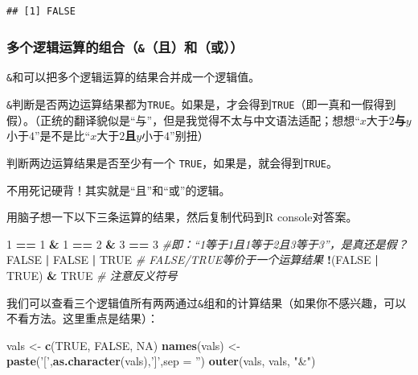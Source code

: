 \documentclass[]{book}
\newenvironment{Shaded}{\begin{snugshade}}{\end{snugshade}}
\newcommand{\CommentTok}[1]{\textcolor[rgb]{0.56,0.35,0.01}{\textit{#1}}}
\newcommand{\DataTypeTok}[1]{\textcolor[rgb]{0.13,0.29,0.53}{#1}}
\newcommand{\DecValTok}[1]{\textcolor[rgb]{0.00,0.00,0.81}{#1}}
\newcommand{\KeywordTok}[1]{\textcolor[rgb]{0.13,0.29,0.53}{\textbf{#1}}}
\newcommand{\NormalTok}[1]{#1}
\newcommand{\OperatorTok}[1]{\textcolor[rgb]{0.81,0.36,0.00}{\textbf{#1}}}
\newcommand{\OtherTok}[1]{\textcolor[rgb]{0.56,0.35,0.01}{#1}}
\newcommand{\StringTok}[1]{\textcolor[rgb]{0.31,0.60,0.02}{#1}}
\begin{document}
\begin{verbatim}
## [1] FALSE
\end{verbatim}

\subsubsection{\texorpdfstring{多个逻辑运算的组合（\texttt{\&}（且）和\texttt{\textbar{}}（或））}{多个逻辑运算的组合（\&（且）和\textbar{}（或））}}

\texttt{\&}和\texttt{\textbar{}}可以把多个逻辑运算的结果合并成一个逻辑值。

\texttt{\&}判断是否两边运算结果都为\texttt{TRUE}。如果是，才会得到\texttt{TRUE}（即一真和一假得到假）。（正统的翻译貌似是``与''，但是我觉得不太与中文语法适配；想想``\(x\)大于\(2\)\textbf{与}\(y\)小于\(4\)''是不是比``\(x\)大于\(2\)\textbf{且}\(y\)小于\(4\)''别扭）

\texttt{\textbar{}}判断两边运算结果是否至少有一个 \texttt{TRUE}，如果是，就会得到\texttt{TRUE}。

不用死记硬背！其实就是``且''和``或''的逻辑。

用脑子想一下以下三条运算的结果，然后复制代码到R console对答案。

\begin{Shaded}
\begin{Highlighting}[]
\DecValTok{1} \OperatorTok{==}\StringTok{ }\DecValTok{1} \OperatorTok{&}\StringTok{ }\DecValTok{1} \OperatorTok{==}\StringTok{ }\DecValTok{2} \OperatorTok{&}\StringTok{ }\DecValTok{3} \OperatorTok{==}\StringTok{ }\DecValTok{3} \CommentTok{#即：“1等于1且1等于2且3等于3”，是真还是假？}
\OtherTok{FALSE} \OperatorTok{|}\StringTok{ }\OtherTok{FALSE} \OperatorTok{|}\StringTok{ }\OtherTok{TRUE} \CommentTok{# FALSE/TRUE等价于一个运算结果}
\OperatorTok{!}\NormalTok{(}\OtherTok{FALSE} \OperatorTok{|}\StringTok{ }\OtherTok{TRUE}\NormalTok{) }\OperatorTok{&}\StringTok{ }\OtherTok{TRUE} \CommentTok{# 注意反义符号}
\end{Highlighting}
\end{Shaded}

我们可以查看三个逻辑值所有两两通过\texttt{\&}组和的计算结果（如果你不感兴趣，可以不看方法。这里重点是结果）：

\begin{Shaded}
\begin{Highlighting}[]
\NormalTok{vals <-}\StringTok{ }\KeywordTok{c}\NormalTok{(}\OtherTok{TRUE}\NormalTok{, }\OtherTok{FALSE}\NormalTok{, }\OtherTok{NA}\NormalTok{) }
\KeywordTok{names}\NormalTok{(vals) <-}\StringTok{ }\KeywordTok{paste}\NormalTok{(}\StringTok{'['}\NormalTok{,}\KeywordTok{as.character}\NormalTok{(vals),}\StringTok{']'}\NormalTok{,}\DataTypeTok{sep =} \StringTok{''}\NormalTok{)}
\KeywordTok{outer}\NormalTok{(vals, vals, }\StringTok{"&"}\NormalTok{)}
\end{Highlighting}
\end{Shaded}
\end{document}
